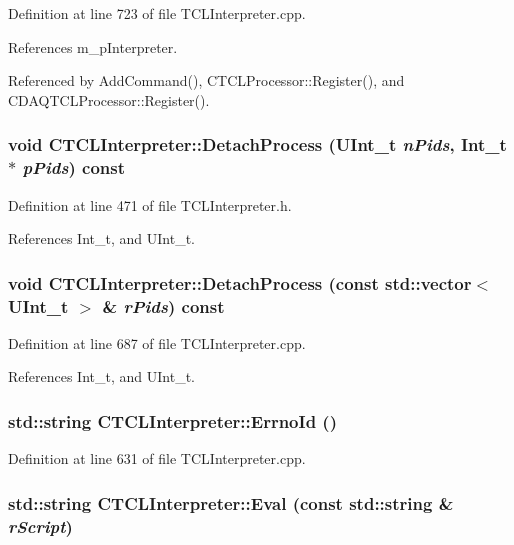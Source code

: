 Definition at line 723 of file TCLInterpreter.cpp.

References m\_\-p\-Interpreter.

Referenced by Add\-Command(), CTCLProcessor::Register(), and CDAQTCLProcessor::Register().
\subsubsection{\setlength{\rightskip}{0pt plus 5cm}void CTCLInterpreter::Detach\-Process ({\bf UInt\_\-t} {\em n\-Pids}, {\bf Int\_\-t} $\ast$ {\em p\-Pids}) const\hspace{0.3cm}{\tt  [inline]}}\label{classCTCLInterpreter_a34}




Definition at line 471 of file TCLInterpreter.h.

References Int\_\-t, and UInt\_\-t.
\subsubsection{\setlength{\rightskip}{0pt plus 5cm}void CTCLInterpreter::Detach\-Process (const std::vector$<$ {\bf UInt\_\-t} $>$ \& {\em r\-Pids}) const}\label{classCTCLInterpreter_a33}




Definition at line 687 of file TCLInterpreter.cpp.

References Int\_\-t, and UInt\_\-t.
\subsubsection{\setlength{\rightskip}{0pt plus 5cm}std::string CTCLInterpreter::Errno\-Id ()\hspace{0.3cm}{\tt  [static]}}\label{classCTCLInterpreter_d0}




Definition at line 631 of file TCLInterpreter.cpp.
\subsubsection{\setlength{\rightskip}{0pt plus 5cm}std::string CTCLInterpreter::Eval (const std::string \& {\em r\-Script})\hspace{0.3cm}{\tt  [inline]}}\label{classCTCLInterpreter_a7}




